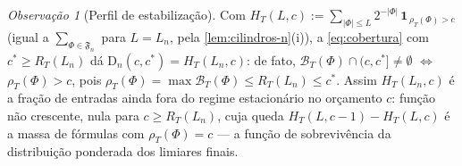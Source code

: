 \documentclass[11pt,a4paper]{article}
\theoremstyle{definition}
\theoremstyle{remark}
\newtheorem*{remark}{Observação}
\begin{document}
\begin{remark}[Perfil de estabilização]\label{rem:perfil-global}
Com $H_T(L,c) := \sum_{|\Phi| \leq L} 2^{-|\Phi|}\,
\mathbf{1}_{\,\rho_T(\Phi) > c}$ (igual a $\sum_{\Phi \in
\mathfrak{F}_n}$ para $L = L_n$, pela \cref{lem:cilindros-n}(i)), a
\eqref{eq:cobertura} com $c^* \geq R_T(L_n)$ dá
$\mathrm{D}_n(c, c^*) = H_T(L_n, c)$: de fato,
$\mathcal{B}_T(\Phi) \cap (c, c^*] \neq \emptyset$ $\iff$
$\rho_T(\Phi) > c$, pois $\rho_T(\Phi) = \max \mathcal{B}_T(\Phi) \leq
R_T(L_n) \leq c^*$. Assim $H_T(L_n, c)$ é a fração de entradas ainda
fora do regime estacionário no orçamento $c$: função não crescente,
nula para $c \geq R_T(L_n)$, cuja queda $H_T(L,c-1) - H_T(L,c)$ é a
massa de fórmulas com $\rho_T(\Phi) = c$ --- a função de sobrevivência
da distribuição ponderada dos limiares finais.
\end{remark}
\end{document}
